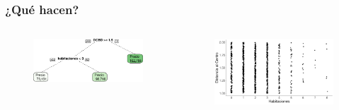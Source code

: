 \documentclass[
  shownotes,
  xcolor={svgnames},
  hyperref={colorlinks,citecolor=DarkBlue,linkcolor=andesred,urlcolor=DarkBlue}
  , aspectratio=169]{beamer}
\begin{document}
\begin{frame}[fragile]
\frametitle{¿Qué hacen?}




  
\begin{columns}[T] %
\begin{column}{.42\textwidth}
  
\begin{figure}[H] \centering
            \captionsetup{justification=centering}
              \includegraphics[scale=0.4]{figures/trees.pdf}                           
 \end{figure}

\end{column}  
\hfill
\begin{column}{.48\textwidth}

 \begin{figure}[H] \centering
            \captionsetup{justification=centering}
              \includegraphics[scale=0.25]{figures/dcbd_hab.pdf}                           
 \end{figure}

\end{column}
\end{columns}

\end{frame}
\end{document}
